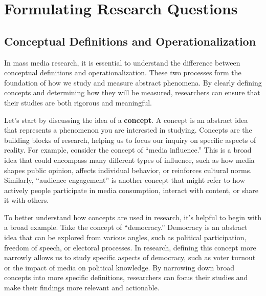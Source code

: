 \documentclass[
]{book}
\begin{document}
\section{Formulating Research Questions}\label{formulating-research-questions}

\subsection{Conceptual Definitions and Operationalization}\label{conceptual-definitions-and-operationalization}

In mass media research, it is essential to understand the difference between conceptual definitions and operationalization. These two processes form the foundation of how we study and measure abstract phenomena. By clearly defining concepts and determining how they will be measured, researchers can ensure that their studies are both rigorous and meaningful.

Let's start by discussing the idea of a \textbf{concept}. A concept is an abstract idea that represents a phenomenon you are interested in studying. Concepts are the building blocks of research, helping us to focus our inquiry on specific aspects of reality. For example, consider the concept of ``media influence.'' This is a broad idea that could encompass many different types of influence, such as how media shapes public opinion, affects individual behavior, or reinforces cultural norms. Similarly, ``audience engagement'' is another concept that might refer to how actively people participate in media consumption, interact with content, or share it with others.

To better understand how concepts are used in research, it's helpful to begin with a broad example. Take the concept of ``democracy.'' Democracy is an abstract idea that can be explored from various angles, such as political participation, freedom of speech, or electoral processes. In research, defining this concept more narrowly allows us to study specific aspects of democracy, such as voter turnout or the impact of media on political knowledge. By narrowing down broad concepts into more specific definitions, researchers can focus their studies and make their findings more relevant and actionable.
\end{document}
